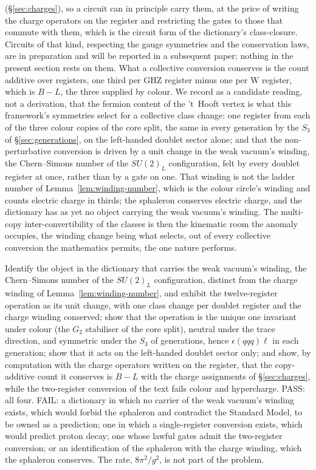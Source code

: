 (\S\ref{sec:charges}), so a circuit can in principle carry them, at the price of writing the charge
operators on the register and restricting the gates to those that commute with them, which is the
circuit form of the dictionary's class-closure. Circuits of that kind, respecting the gauge
symmetries and the conservation laws, are in preparation and will be reported in a subsequent
paper; nothing in the present section rests on them. What a
collective conversion conserves is the count additive over registers, one third per GHZ register
minus one per W register, which is $B-L$, the three supplied by colour. We record as a candidate
reading, not a derivation, that the fermion content of the 't~Hooft vertex is what this
framework's symmetries select for a collective class change: one register from each of the three
colour copies of the core split, the same in every generation by the $S_{3}$ of
\S\ref{sec:generations}, on the left-handed doublet sector alone; and that the non-perturbative conversion is driven by a unit change in the weak vacuum's winding,
the Chern--Simons number of the $SU(2)_{L}$ configuration, felt by every doublet register at
once, rather than by a gate on one. That winding is not the ladder number of
Lemma~\ref{lem:winding-number}, which is the colour circle's winding and counts electric charge
in thirds; the sphaleron conserves electric charge, and the dictionary has as yet no object
carrying the weak vacuum's winding. The multi-copy inter-convertibility of the classes is then the
kinematic room the anomaly occupies, the winding change being what selects, out of every
collective conversion the mathematics permits, the one nature performs.

\begin{openproblem}\label{op:sphaleron}
Identify the object in the dictionary that carries the weak vacuum's winding, the Chern--Simons
number of the $SU(2)_{L}$ configuration, distinct from the charge winding of
Lemma~\ref{lem:winding-number}, and exhibit the twelve-register operation as its unit change, with
one class change per doublet register and the charge winding conserved; show that the operation is
the unique one invariant under colour (the $G_{2}$ stabiliser of the core split), neutral under the
trace direction, and symmetric under the $S_{3}$ of generations, hence $\epsilon(qqq)\ell$ in each
generation; show that it acts on the left-handed doublet sector only; and show, by computation with
the charge operators written on the register, that the copy-additive count it conserves is $B-L$
with the charge assignments of \S\ref{sec:charges}, while the two-register conversion of the text
fails colour and hypercharge. PASS: all four. FAIL: a dictionary in which no carrier of the weak
vacuum's winding exists, which would forbid the sphaleron and contradict the Standard Model, to be
owned as a prediction; one in which a single-register conversion exists, which would predict proton
decay; one whose lawful gates admit the two-register conversion; or an identification of the
sphaleron with the charge winding, which the sphaleron conserves. The rate, $8\pi^{2}/g^{2}$, is
not part of the problem.
\end{openproblem}

